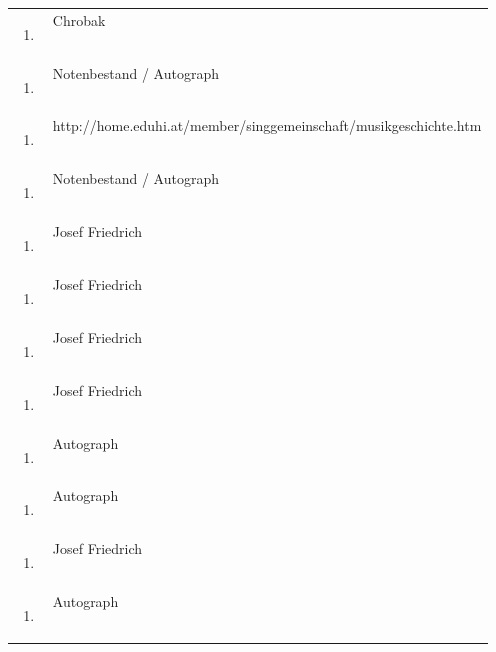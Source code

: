 \begin{flushleft}
\begin{supertabular}{m{1.2409999cm}m{14.604cm}}
\begin{enumerate}
\item
\end{enumerate}
 &
Chrobak\\
\begin{enumerate}
\item
\end{enumerate}
 &
Notenbestand / Autograph\\
\begin{enumerate}
\item
\end{enumerate}
 &
http://home.eduhi.at/member/singgemeinschaft/musikgeschichte.htm\\
\begin{enumerate}
\item
\end{enumerate}
 &
Notenbestand / Autograph\\
\begin{enumerate}
\item
\end{enumerate}
 &
Josef Friedrich\\
\begin{enumerate}
\item
\end{enumerate}
 &
Josef Friedrich\\
\begin{enumerate}
\item
\end{enumerate}
 &
Josef Friedrich\\
\begin{enumerate}
\item
\end{enumerate}
 &
Josef Friedrich\\
\begin{enumerate}
\item
\end{enumerate}
 &
Autograph\\
\begin{enumerate}
\item
\end{enumerate}
 &
Autograph\\
\begin{enumerate}
\item
\end{enumerate}
 &
Josef Friedrich\\
\begin{enumerate}
\item
\end{enumerate}
 &
Autograph\\

\end{supertabular}
\end{flushleft}

